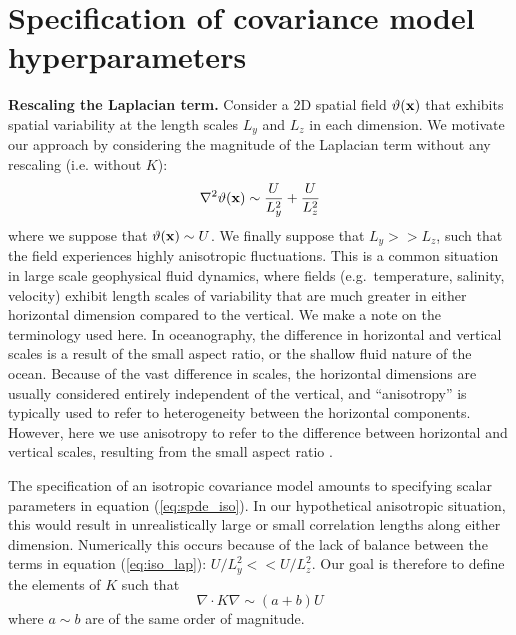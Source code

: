 \section{Specification of covariance model hyperparameters}
\label{sec:matern_operator}

\noindent\textbf{Rescaling the Laplacian term.}
Consider a 2D spatial field $\vartheta(\mathbf{x})$ that exhibits spatial variability at the
length scales $L_y$ and $L_z$ in each dimension.
We motivate our approach by considering the magnitude of
the Laplacian term without any rescaling (i.e. without $K$):
\begin{equation}
    \nabla^2 \vartheta(\mathbf{x}) \sim \dfrac{U}{L_y^2} + \dfrac{U}{L_z^2}
    \label{eq:iso_lap}
\end{equation}
where we suppose that $\vartheta(\mathbf{x})\sim U$.
We finally suppose that $L_y >> L_z$, such that the field experiences highly
anisotropic fluctuations.
This is a common situation in large scale geophysical fluid
dynamics, where fields (e.g.\ temperature, salinity, velocity) exhibit length scales of
variability that are much greater in either horizontal dimension compared to the
vertical.
We make a note on the terminology used here.
In oceanography, the difference in horizontal and vertical scales
is a result of the small aspect ratio, or the shallow fluid nature of the ocean.
Because of the vast difference in scales, the horizontal dimensions are usually
considered entirely independent of the vertical, and ``anisotropy'' is typically
used to refer to heterogeneity between the horizontal components.
However, here we use anisotropy to refer to the difference between horizontal
and vertical scales, resulting from the small aspect ratio \citep{vallis2006}.

The specification of an isotropic covariance model amounts to specifying scalar
parameters in equation (\ref{eq:spde_iso}).
In our hypothetical anisotropic  situation, this would result in unrealistically large or
small correlation lengths along either dimension.
Numerically this occurs because of the lack of balance between the terms in
equation (\ref{eq:iso_lap}): $U/L_y^2 << U/L_z^2$.
Our goal is therefore to define the elements of $K$ such that
\begin{equation*}
    \nabla\cdot K\nabla \sim (a+b)U
\end{equation*}
where $a \sim b$ are of the same order of magnitude.

